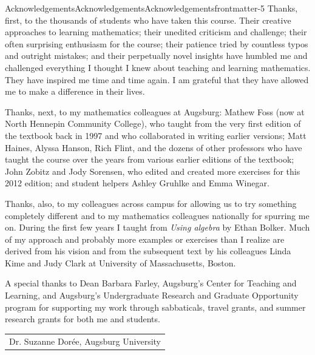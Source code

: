 \documentclass[twoside,11pt,]{book}
\numberwithin{equation}{section}
\begin{document}
\begin{acknowledgement}{Acknowledgements}{Acknowledgements}{}{Acknowledgements}{}{}{frontmatter-5}
Thanks, first, to the thousands of students who have taken this course. Their creative approaches to learning mathematics; their unedited criticism and challenge; their often surprising enthusiasm for the course; their patience tried by countless typos and outright mistakes; and their perpetually novel insights have humbled me and challenged everything I thought I knew about teaching and learning mathematics. They have inspired me time and time again. I am grateful that they have allowed me to make a difference in their lives.%
\par
Thanks, next, to my mathematics colleagues at Augsburg: Mathew Foss (now at North Hennepin Community College), who taught from the very first edition of the textbook back in 1997 and who collaborated in writing earlier versions; Matt Haines, Alyssa Hanson, Rich Flint, and the dozens of other professors who have taught the course over the years from various earlier editions of the textbook; John Zobitz and Jody Sorensen, who edited and created more exercises for this 2012 edition; and student helpers Ashley Gruhlke and Emma Winegar.%
\par
Thanks, also, to my colleagues across campus for allowing us to try something completely different and to my mathematics colleagues nationally for spurring me on. During the first few years I taught from \emph{Using algebra} by Ethan Bolker. Much of my approach and probably more examples or exercises than I realize are derived from his vision and from the subsequent text by his colleagues Linda Kime and Judy Clark at University of Massachusetts, Boston.%
\par
A special thanks to Dean Barbara Farley, Augsburg's Center for Teaching and Learning, and Augsburg's Undergraduate Research and Graduate Opportunity program for supporting my work through sabbaticals, travel grants, and summer research grants for both me and students.%
\nopagebreak\par%
\hfill\begin{tabular}[t]{l@{}}
Dr. Suzanne Dorée, Augsburg University
\end{tabular}\\\par
\end{acknowledgement}
%
%
\typeout{************************************************}
\typeout{************************************************}
%
\end{document}
